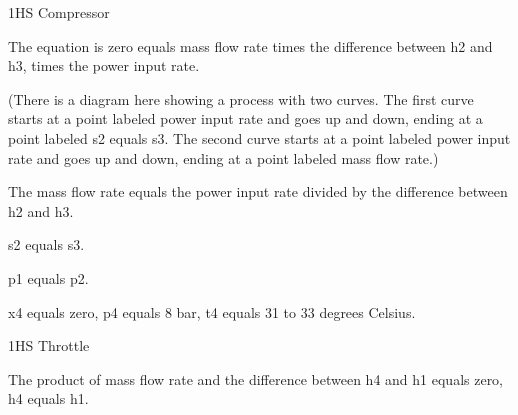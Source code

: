 1HS Compressor

The equation is zero equals mass flow rate times the difference between h2 and h3, times the power input rate.

(There is a diagram here showing a process with two curves. The first curve starts at a point labeled power input rate and goes up and down, ending at a point labeled s2 equals s3. The second curve starts at a point labeled power input rate and goes up and down, ending at a point labeled mass flow rate.)

The mass flow rate equals the power input rate divided by the difference between h2 and h3.

s2 equals s3.

p1 equals p2.

x4 equals zero, p4 equals 8 bar, t4 equals 31 to 33 degrees Celsius.

1HS Throttle

The product of mass flow rate and the difference between h4 and h1 equals zero, h4 equals h1.
